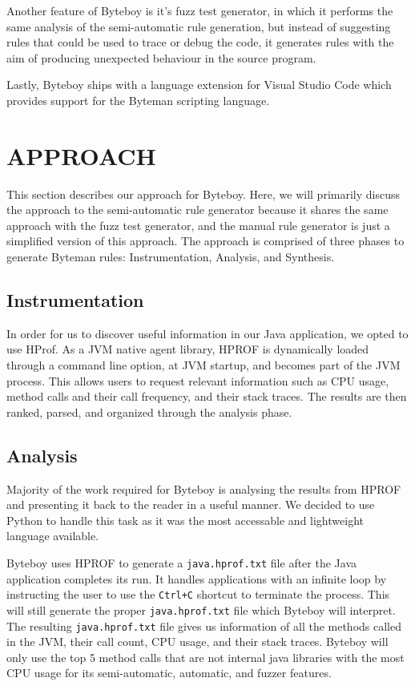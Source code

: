 \documentclass[letterpaper,twocolumn,10pt]{article}
\begin{document}
Another feature of Byteboy is it's fuzz test generator, in which it performs the same analysis of the semi-automatic rule generation, but instead of suggesting rules that could be used to trace or debug the code, it generates rules with the aim of producing unexpected behaviour in the source program.

Lastly, Byteboy ships with a language extension for Visual Studio Code which provides support for the Byteman scripting language.

\section{APPROACH}

This section describes our approach for Byteboy. Here, we will primarily discuss the approach to the semi-automatic rule generator because it shares the same approach with the fuzz test generator, and the manual rule generator is just a simplified version of this approach. The approach is comprised of three phases to generate Byteman rules: Instrumentation, Analysis, and Synthesis.

\subsection{Instrumentation}

In order for us to discover useful information in our Java application, we opted to use HProf. As a JVM native agent library, HPROF is dynamically loaded through a command line option, at JVM startup, and becomes part of the JVM process\cite{hprof}. This allows users to request relevant information such as CPU usage, method calls and their call frequency, and their stack traces. The results are then ranked, parsed, and organized through the analysis phase.  

\subsection{Analysis}

Majority of the work required for Byteboy is analysing the results from HPROF and presenting it back to the reader in a useful manner. We decided to use Python to handle this task as it was the most accessable and lightweight language available. 

Byteboy uses HPROF to generate a {\tt java.hprof.txt} file after the Java application completes its run. It handles applications with an infinite loop by instructing the user to use the {\tt Ctrl+C} shortcut to terminate the process. This will still generate the proper {\tt java.hprof.txt} file which Byteboy will interpret. The resulting {\tt java.hprof.txt} file gives us information of all the methods called in the JVM, their call count, CPU usage, and their stack traces. Byteboy will only use the top 5 method calls that are not internal java libraries with the most CPU usage for its semi-automatic, automatic, and fuzzer features.  
\end{document}
